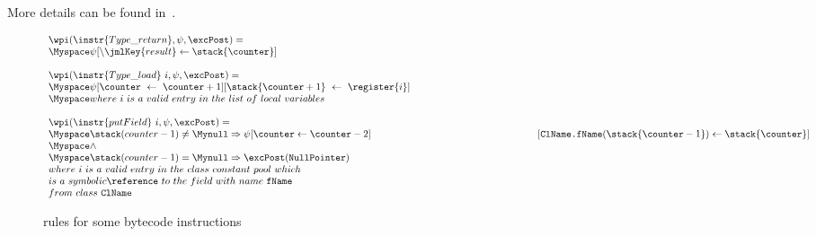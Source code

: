  More details can be found in~\cite{WPBC}.
\begin{figure}[ht]

$$
\begin{array}{l}
\wpi(\instr{Type\_return} , \psi, \excPost) =  \\
 \Myspace \psi[\backslash \jmlKey{result} \leftarrow \stack{\counter}] \\
\\
\wpi(\instr{Type\_load} \ i, \psi, \excPost) =  \\
\Myspace \psi[\counter \ \leftarrow \ \counter+1] [\stack{\counter+1} \ \leftarrow \ \register{i}] \\
 \Myspace where \ i \  is \ a \ valid \ entry \ in \ the \ list \  of \  local \ variables   \\
\\ 
\wpi(\instr{putField} \ i, \psi, \excPost) = \\
   \Myspace \stack(counter -1) \not= \Mynull \Rightarrow \psi[\counter   \leftarrow \counter -2]
   \phantom{ aaa \stack(counter -1) \not= \Mynull \Rightarrow}   [  \texttt{ClName.fName}(\stack{\counter - 1} ) \leftarrow   \stack{\counter}] \\
   \Myspace  \wedge  \\
   \Myspace  \stack(counter -1) = \Mynull \Rightarrow \excPost(\texttt{NullPointer}) \\
 where \ i \  is \ a \ valid \ entry \ in \ the \ class \ constant \  pool \ which   \\
 is  \ a \  symbolic \reference \ to \ the \  field  \ with \ name \  \texttt{fName} \\
 from \  class \  \texttt{ClName}
 \end{array} $$



\caption{rules for some bytecode instructions}
\label{instrWP}
\end{figure}

